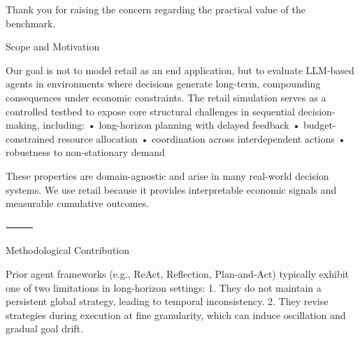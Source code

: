 






Thank you for raising the concern regarding the practical value of the benchmark.

Scope and Motivation

Our goal is not to model retail as an end application, but to evaluate LLM-based agents in environments where decisions generate long-term, compounding consequences under economic constraints. The retail simulation serves as a controlled testbed to expose core structural challenges in sequential decision-making, including:
	•	long-horizon planning with delayed feedback
	•	budget-constrained resource allocation
	•	coordination across interdependent actions
	•	robustness to non-stationary demand

These properties are domain-agnostic and arise in many real-world decision systems. We use retail because it provides interpretable economic signals and measurable cumulative outcomes.

⸻

Methodological Contribution

Prior agent frameworks (e.g., ReAct, Reflection, Plan-and-Act) typically exhibit one of two limitations in long-horizon settings:
	1.	They do not maintain a persistent global strategy, leading to temporal inconsistency.
	2.	They revise strategies during execution at fine granularity, which can induce oscillation and gradual goal drift.

